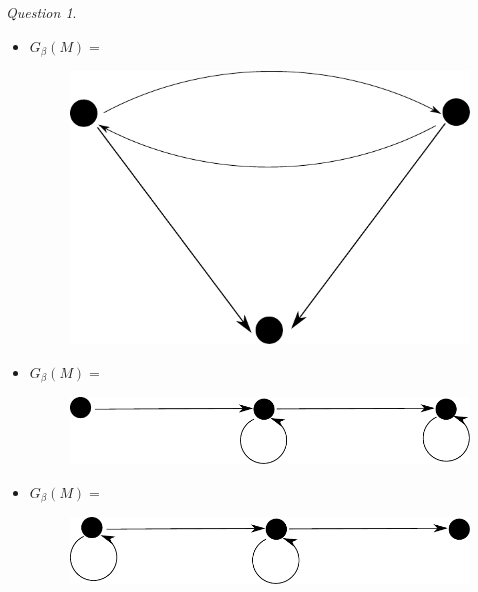 \documentclass[11pt]{article}
\theoremstyle{definition}
\theoremstyle{remark}
\theoremstyle{remark}
\newtheorem{question}{Question}
\theoremstyle{definition}
\begin{document}
\begin{question}
\begin{itemize}
    \item $G_\beta(M) = $
          \begin{figure}[H]
            \centering
            \includegraphics[scale=0.5]{../graphs/exercise-3-5-2-iii-1.pdf}
          \end{figure}

    \item $G_\beta(M) = $
          \begin{figure}[H]
            \centering
            \includegraphics[scale=0.5]{../graphs/exercise-3-5-2-iii-2.pdf}
          \end{figure}

    \item $G_\beta(M) = $
          \begin{figure}[H]
            \centering
            \includegraphics[scale=0.5]{../graphs/exercise-3-5-2-iii-3.pdf}
          \end{figure}
  \end{itemize}
\end{question}
\end{document}
